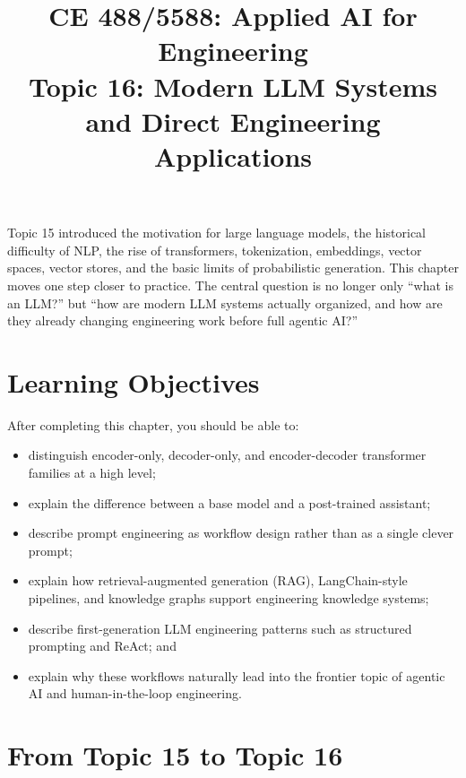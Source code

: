 \documentclass[12pt]{article}
\begin{document}
\doublespacing

\title{CE 488/5588: Applied AI for Engineering\\ \large Topic 16: Modern LLM Systems and Direct Engineering Applications}
\author{}
\date{}
\maketitle

\begin{ch-box}
Topic 15 introduced the motivation for large language models, the historical difficulty of NLP, the rise of transformers, tokenization, embeddings, vector spaces, vector stores, and the basic limits of probabilistic generation. This chapter moves one step closer to practice. The central question is no longer only ``what is an LLM?'' but ``how are modern LLM systems actually organized, and how are they already changing engineering work before full agentic AI?''
\end{ch-box}

\section*{Learning Objectives}
After completing this chapter, you should be able to:
\begin{itemize}
    \item distinguish encoder-only, decoder-only, and encoder-decoder transformer families at a high level;
    \item explain the difference between a base model and a post-trained assistant;
    \item describe prompt engineering as workflow design rather than as a single clever prompt;
    \item explain how retrieval-augmented generation (RAG), LangChain-style pipelines, and knowledge graphs support engineering knowledge systems;
    \item describe first-generation LLM engineering patterns such as structured prompting and ReAct; and
    \item explain why these workflows naturally lead into the frontier topic of agentic AI and human-in-the-loop engineering.
\end{itemize}

\section{From Topic 15 to Topic 16}
\end{document}
